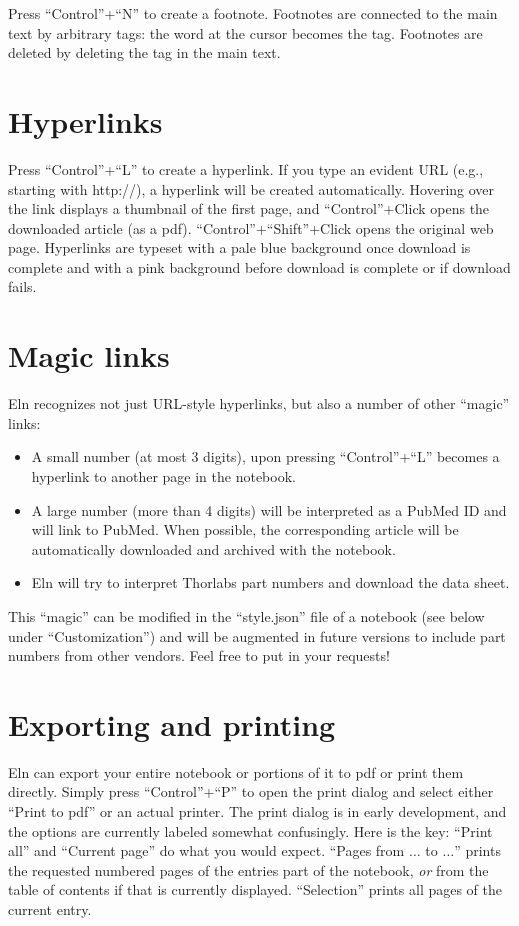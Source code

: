 \documentclass[11pt]{report}
\begin{document}
Press ``Control''+``N'' to create a footnote. Footnotes are connected
to the main text by arbitrary tags: the word at the cursor
becomes the tag. Footnotes are deleted by deleting the tag in the main text.

\section{Hyperlinks}

Press ``Control''+``L'' to create a hyperlink. If you
type an evident URL (e.g., starting with http://), a hyperlink will be
created automatically. Hovering over the link displays a
thumbnail of the first page, and ``Control''+Click opens the
downloaded article (as a pdf). ``Control''+``Shift''+Click opens the
original web page. Hyperlinks are typeset with a pale blue background
once download is complete and with a pink background before download
is complete or if download fails.

\section{Magic links}

Eln recognizes not just URL-style hyperlinks, but also a number of
other ``magic'' links:
\begin{itemize}
\item A small number (at most 3 digits), upon pressing ``Control''+``L''
becomes a hyperlink to another page in the notebook.
\item A large number (more than 4 digits)
will be interpreted as a PubMed ID and will link to PubMed. When
possible, the corresponding article will be automatically downloaded
and archived with the notebook. 
\item Eln will try to interpret Thorlabs part numbers and
  download the data sheet.
\end{itemize}
This ``magic'' can be modified in the ``style.json'' file of a
notebook (see below under ``Customization'') and will be augmented in
future versions to include part numbers from other vendors. Feel free
to put in your requests!

\section{Exporting and printing}

Eln can export your entire notebook or portions of it to pdf or print
them directly. Simply press ``Control''+``P'' to open the print dialog
and select either ``Print to pdf'' or an actual printer. The print
dialog is in early development, and the options are currently labeled
somewhat confusingly. Here is the key: ``Print all'' and ``Current
page'' do what you would expect. ``Pages from $\ldots$ to $\ldots$''
prints the requested numbered pages of the entries part of the
notebook, \emph{or} from the table of contents if that is currently
displayed. ``Selection'' prints all pages of the current entry.
\end{document}
